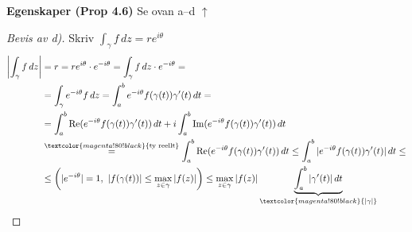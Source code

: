 \textbf{Egenskaper (Prop 4.6)} \quad Se ovan a--d $\uparrow$

\begin{proof}[Bevis av d)]
Skriv $\displaystyle\int_\gamma f\,dz = re^{i\theta}$
\begin{align*}
  \left| \int_\gamma f\,dz \right| &= r = re^{i\theta} \cdot e^{-i\theta} = \int_\gamma f\,dz \cdot e^{-i\theta} = \\
  &= \int_\gamma e^{-i\theta} f\,dz = \int_a^b e^{-i\theta} f(\gamma(t))\gamma'(t)\,dt = \\
  &= \int_a^b \operatorname{Re}(e^{-i\theta} f(\gamma(t))\gamma'(t))\,dt + i\int_a^b \operatorname{Im}(e^{-i\theta} f(\gamma(t))\gamma'(t))\,dt \\
  &\overset{\textcolor{magenta!80!black}{\text{ty reellt}}}{=} \int_a^b \operatorname{Re}(e^{-i\theta} f(\gamma(t))\gamma'(t))\,dt \le \int_a^b |e^{-i\theta} f(\gamma(t))\gamma'(t)|\,dt \le \\
  &\le \left( |e^{-i\theta}| = 1,\ |f(\gamma(t))| \le \max_{z \in \gamma} |f(z)| \right) \le \max_{z \in \gamma} |f(z)| \underbrace{\int_a^b |\gamma'(t)|\,dt}_{\textcolor{magenta!80!black}{|\gamma|}}
\end{align*}
\end{proof}
